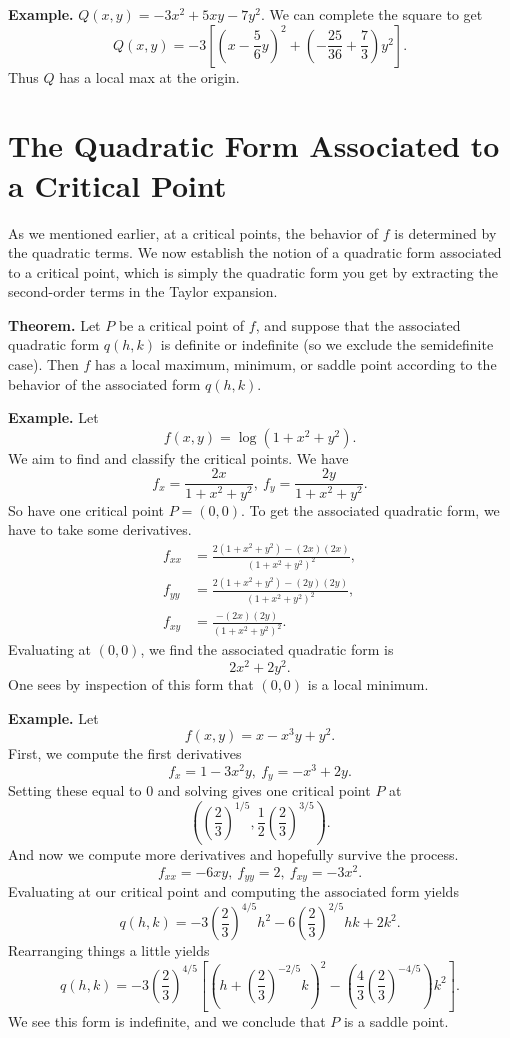 \documentclass{article}
\begin{document}
\textbf{Example.} $Q(x,y) = -3x^2 + 5xy - 7y^2$. We can complete the square
to get 
\[Q(x,y) = -3 \left[ \left( x - \frac{5}{6}y \right)^2 + \left( -\frac{25}{36} + \frac{7}{3} \right)y^2  \right].\]
Thus $Q$ has a local max at the origin.


\section*{The Quadratic Form Associated to a Critical Point}

As we mentioned earlier, at a critical points, the behavior of $f$ 
is determined by the quadratic terms. We now establish the notion of a 
quadratic form associated to a critical point, which is simply the quadratic
form you get by extracting the second-order terms in the Taylor expansion.

\textbf{Theorem.} Let $P$ be a critical point of $f$, and suppose that
the associated quadratic form $q(h,k)$ is definite or indefinite (so we exclude 
the semidefinite case). Then $f$ has a local maximum, minimum, or 
saddle point according to the behavior of the associated form $q(h,k)$.

\textbf{Example.} Let 
\[f(x,y) = \log(1+x^2+y^2).\]
We aim to find and classify the critical points. We have 
\[f_{x} = \frac{2x}{1+x^2+y^2},\ f_{y} = \frac{2y}{1+x^2+y^2}.\]
So have one critical point $P = (0,0)$. To get the associated quadratic
form, we have to take some derivatives.
\begin{align*}
    f_{xx} &= \frac{2(1+x^2+y^2) - (2x)(2x)}{(1+x^2+y^2)^2},\\
    f_{yy} &= \frac{2(1+x^2+y^2) - (2y)(2y)}{(1+x^2+y^2)^2},\\
    f_{xy} &= \frac{-(2x)(2y)}{(1+x^2+y^2)^2}.
\end{align*}
Evaluating at $(0,0)$, we find the associated quadratic form is 
\[2x^2 + 2y^2.\]
One sees by inspection of this form that $(0,0)$ is a local minimum. 

\textbf{Example.} Let 
\[f(x,y) = x - x^3y + y^2.\]
First, we compute the first derivatives 
\[f_x = 1 - 3x^2y,\ f_y = -x^3 + 2y.\]
Setting these equal to $0$ and solving gives one critical point $P$
at
\[ \left( \left(\frac{2}{3}\right)^{1/5}, \frac{1}{2} \left(\frac{2}{3}\right)^{3/5} \right). \]
And now we compute more derivatives and hopefully survive the process.
\[ f_{xx} = -6xy,\ f_{yy} = 2,\ f_{xy} = -3x^2.\]
Evaluating at our critical point and computing the associated form yields
\[q(h,k) = -3 \left( \frac{2}{3} \right)^{4/5} h^2 - 6\left( \frac{2}{3} \right)^{2/5}hk + 2k^2.\]
Rearranging things a little yields
\[q(h,k) = -3  \left( \frac{2}{3} \right)^{4/5} \left[ \left( h
 + \left( \frac{2}{3} \right)^{-2/5} k \right)^2 
 - \left( \frac{4}{3} \left( \frac{2}{3} \right)^{-4/5} \right) k^2 \right].\]
 We see this form is indefinite, and we conclude that $P$ is a saddle point.
\end{document}
